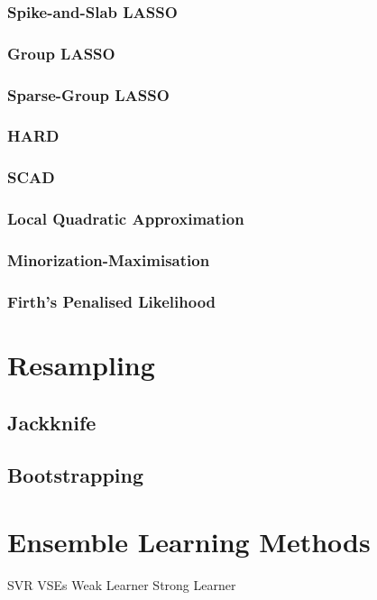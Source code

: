 \subsubsection{Spike-and-Slab LASSO}
\subsubsection{Group LASSO}

\subsubsection{Sparse-Group LASSO}
\subsubsection{HARD}
\subsubsection{SCAD}
\subsubsection{Local Quadratic Approximation}
\subsubsection{Minorization-Maximisation}
\subsubsection{Firth's Penalised Likelihood}

\section{Resampling}
\subsection{Jackknife}
\subsection{Bootstrapping}

\section{Ensemble Learning Methods}
SVR
VSEs
Weak Learner
Strong Learner
